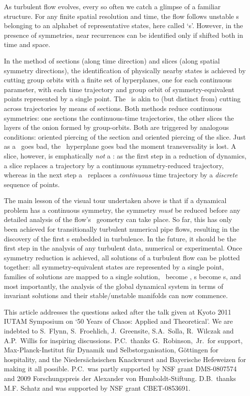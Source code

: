 \documentclass[aip,cha,reprint,
secnumarabic,
nofootinbib, tightenlines,
nobibnotes, showkeys, showpacs,
groupedaddress
]{revtex4-1}
\begin{document}
As turbulent flow evolves, every so often we catch a glimpse of a
familiar structure. For any finite spatial resolution and time, the flow
follows  unstable {\cohStr s} belonging to an alphabet of representative
states, here called `\template s'. However, in the presence of
symmetries, near recurrences can be identified only if shifted both in
time and space.

In the method of sections (along time direction) and slices (along
spatial symmetry directions), the identification of physically nearby
states is achieved by cutting group orbits with a finite set of
hyperplanes, one for each continuous parameter, with each time trajectory
and group orbit of symmetry-equivalent points represented by a single
point. The \mslices\ is akin to (but distinct
from) cutting across trajectories by means of sections. Both methods
reduce continuous symmetries: one sections the continuous-time
trajectories, the other slices the layers of the onion formed by
group-orbits. Both are triggered by analogous conditions: oriented
piercing of the section and oriented piercing of the slice. Just as a
\PoincSec\ goes bad, the \slice\ hyperplane goes bad the moment
transversality is lost. A slice, however, is emphatically \emph{not} a
\PoincSec:
as the first step in a reduction of dynamics, a slice replaces a trajectory
by a continuous symmetry-reduced trajectory, whereas in the next step a
\PoincSec\ replaces a \emph{continuous} time trajectory by a
\emph{discrete} sequence of points.

The main lesson of the visual tour undertaken above is that if a
dynamical problem has a continuous symmetry, the symmetry \emph{must} be
reduced before any detailed analysis of the flow's \statesp\ geometry can
take place. So far, this has only been achieved for transitionally
turbulent numerical pipe flows, resulting in the discovery of
the first \rpo s embedded in turbulence. In the future, it should be the
first step in the analysis of any turbulent data, numerical or
experimental. Once symmetry reduction is achieved, all
solutions of a turbulent flow can be plotted together: all
symmetry-equivalent states are represented by a single point, families of
solutions are mapped to a single solution, \reqva\ become \eqva, \rpo s
become \po s, and most importantly, the analysis of the global dynamical
system in terms of invariant solutions and their stable/unstable
manifolds can now commence.

\begin{acknowledgments}
This article addresses the questions asked after the talk given at
Kyoto 2011 IUTAM Symposium on `50 Years of Chaos: Applied and Theoretical'.
We are indebted to
S.~Flynn,
S.~Froehlich,
J.~Greensite,
S.A.~Solla,
R.~Wilczak
and
A.P.~Willis
for inspiring discussions.
P.C.\ thanks G.~Robinson,~Jr.\ for support,
Max-Planck-Institut f\"ur Dynamik und Selbstorganisation,
G\"ottingen for hospitality,
and the Nieders\"achsischen Knackwurst and Bayerische Hefeweizen for
making it all possible.
P.C.\ was partly supported by NSF grant DMS-0807574
and
2009 Forschungspreis der Alexander von Humboldt-Stiftung.
D.B.\ thanks M.F. Schatz and was supported by NSF grant CBET-0853691.
\end{acknowledgments}
\end{document}
